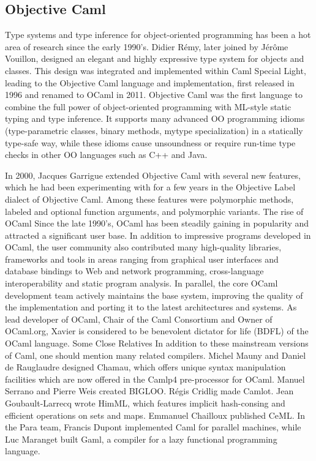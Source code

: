 \documentclass[14pt]{matmex-diploma-custom}
\begin{document}
\subsection{Objective Caml}
Type systems and type inference for object-oriented programming has been a hot area of research since the early 1990's. Didier Rémy, later joined by Jérôme Vouillon, designed an elegant and highly expressive type system for objects and classes. This design was integrated and implemented within Caml Special Light, leading to the Objective Caml language and implementation, first released in 1996 and renamed to OCaml in 2011. Objective Caml was the first language to combine the full power of object-oriented programming with ML-style static typing and type inference. It supports many advanced OO programming idioms (type-parametric classes, binary methods, mytype specialization) in a statically type-safe way, while these idioms cause unsoundness or require run-time type checks in other OO languages such as C++ and Java.

In 2000, Jacques Garrigue extended Objective Caml with several new features, which he had been experimenting with for a few years in the Objective Label dialect of Objective Caml. Among these features were polymorphic methods, labeled and optional function arguments, and polymorphic variants.
The rise of OCaml
Since the late 1990's, OCaml has been steadily gaining in popularity and attracted a significant user base. In addition to impressive programs developed in OCaml, the user community also contributed many high-quality libraries, frameworks and tools in areas ranging from graphical user interfaces and database bindings to Web and network programming, cross-language interoperability and static program analysis. In parallel, the core OCaml development team actively maintains the base system, improving the quality of the implementation and porting it to the latest architectures and systems. As lead developer of OCaml, Chair of the Caml Consortium and Owner of OCaml.org, Xavier is considered to be benevolent dictator for life (BDFL) of the OCaml language.
Some Close Relatives
In addition to these mainstream versions of Caml, one should mention many related compilers. Michel Mauny and Daniel de Rauglaudre designed Chamau, which offers unique syntax manipulation facilities which are now offered in the Camlp4 pre-processor for OCaml.
Manuel Serrano and Pierre Weis created BIGLOO. Régis Cridlig made Camlot. Jean Goubault-Larrecq wrote HimML, which features implicit hash-consing and efficient operations on sets and maps. Emmanuel Chailloux published CeML. In the Para team, Francis Dupont implemented Caml for parallel machines, while Luc Maranget built Gaml, a compiler for a lazy functional programming language.
\end{document}
